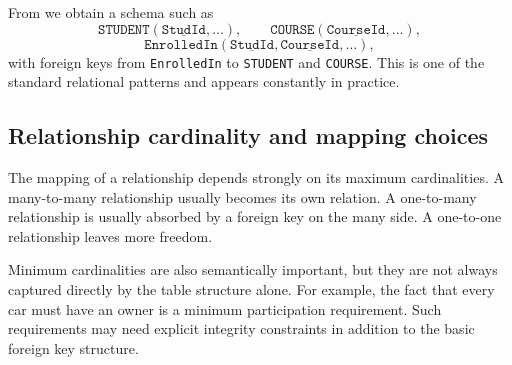 \documentclass[11pt,a4paper,openany]{book}
\begin{document}
From  we obtain a schema such as
\[
\texttt{STUDENT}(\underline{\texttt{StudId}}, \ldots),
\qquad
\texttt{COURSE}(\underline{\texttt{CourseId}}, \ldots),
\]
\[
\texttt{EnrolledIn}(\underline{\texttt{StudId}}, \underline{\texttt{CourseId}}, \ldots),
\]
with foreign keys from \texttt{EnrolledIn} to \texttt{STUDENT} and \texttt{COURSE}. This is one of the standard relational patterns and appears constantly in practice.

\subsection{Relationship cardinality and mapping choices}
The mapping of a relationship depends strongly on its maximum cardinalities. A many-to-many relationship usually becomes its own relation. A one-to-many relationship is usually absorbed by a foreign key on the many side. A one-to-one relationship leaves more freedom.

Minimum cardinalities are also semantically important, but they are not always captured directly by the table structure alone. For example, the fact that every car must have an owner is a minimum participation requirement. Such requirements may need explicit integrity constraints in addition to the basic foreign key structure.
\end{document}
